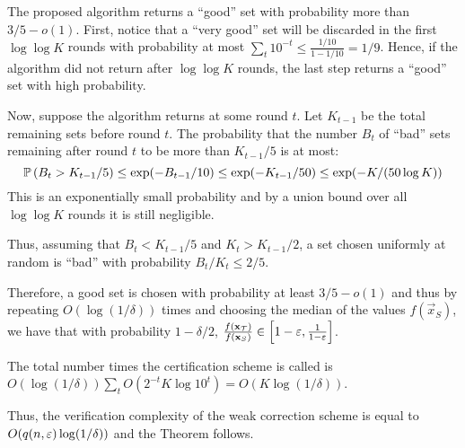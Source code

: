 The proposed algorithm returns a ``good'' set with probability more than $3/5 - o(1)$.
First, notice that a ``very good'' set will be discarded in the first $\log \log K$ rounds with probability at most $\sum_t 10^{-t} \le \frac {1/10} {1 - 1/10} = 1/9$.
Hence, if the algorithm did not return after $\log \log K$ rounds, the last step returns a ``good'' set with high probability.

Now, suppose the algorithm returns at some round $t$. Let $K_{t-1}$ be the total remaining sets before round $t$. The probability that the number $B_t$ of ``bad'' sets remaining after round $t$ to be more than $K_{t-1}/5$ is at most:
$$\mathbb{P}\left(B_t > K_{t-1}/5\right) \le \exp(-B_{t-1}/10) \le \exp(-K_{t-1}/50) \le \exp(-K/(50 \log K))$$
This is an exponentially small probability and by a union bound over all $\log \log K$ rounds it is still negligible.

Thus, assuming that $B_t < K_{t-1}/5$ and $K_t > K_{t-1}/2$, a set chosen uniformly at random is ``bad'' with probability $B_t/K_t \le 2/5$.

Therefore, a good set is chosen with probability at least $3/5 - o(1)$ and thus by repeating $O(\log(1/\delta))$ times and choosing the median of the values $f(\vec{x}_S)$, we have that with probability $1 - \delta/2$, $\frac{f(\mathbf{x}_{\mathcal{T}})}{f(\mathbf{x}_S)} \in \left[ 1 - \varepsilon, \frac{1}{1 - \varepsilon} \right]$.


The total number times the certification scheme is called is $O(\log(1/\delta) ) \sum_t O(2^{-t} K \log 10^{t}) = O( K \log(1/\delta) )$.

Thus, the verification complexity of the weak correction scheme is equal to $O(q(n,\varepsilon) \log(1/\delta))$ and the Theorem follows.
